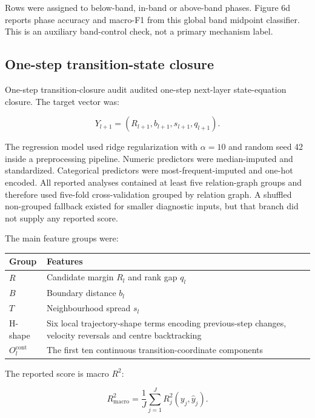 \documentclass[11pt]{article}
\begin{document}
Rows were assigned to below-band, in-band or above-band phases. Figure 6d reports phase accuracy and macro-F1 from this global band midpoint classifier. This is an auxiliary band-control check, not a primary mechanism label.

\subsection*{One-step transition-state closure}
One-step transition-closure audit audited one-step next-layer state-equation closure. The target vector was:

\begin{equation*}
Y_{l+1}=\left(R_{l+1},b_{l+1},s_{l+1},q_{l+1}\right).
\end{equation*}

The regression model used ridge regularization with \(\alpha=10\) and random seed 42 inside a preprocessing pipeline. Numeric predictors were median-imputed and standardized. Categorical predictors were most-frequent-imputed and one-hot encoded. All reported analyses contained at least five relation-graph groups and therefore used five-fold cross-validation grouped by relation graph. A shuffled non-grouped fallback existed for smaller diagnostic inputs, but that branch did not supply any reported score.

The main feature groups were:

\begin{table}[H]
\centering\scriptsize\sloppy
\begin{tabularx}{\textwidth}{@{}XX@{}}
\toprule
Group & Features \\
\midrule
\(R\) & Candidate margin \(R_l\) and rank gap \(q_l\) \\
\(B\) & Boundary distance \(b_l\) \\
\(T\) & Neighbourhood spread \(s_l\) \\
H-shape & Six local trajectory-shape terms encoding previous-step changes, velocity reversals and centre backtracking \\
\(O_l^{\mathrm{cont}}\) & The first ten continuous transition-coordinate components \\
\bottomrule
\end{tabularx}
\end{table}

The reported score is macro \(R^2\):

\begin{equation*}
R^2_{\mathrm{macro}}=\frac{1}{J}\sum_{j=1}^{J}R_j^2(y_j,\hat y_j).
\end{equation*}
\end{document}
